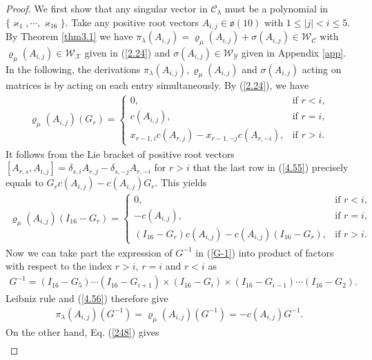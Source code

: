 \documentclass[12pt]{article}
\numberwithin{equation}{section}
\theoremstyle{definition}
\theoremstyle{remark}
\begin{document}
\begin{proof}
	We first show that any singular vector in $\mathscr{C}_{\lambda}$ must be a polynomial in $\{\varkappa_1,\cdots,\varkappa_{16}\}$.
	Take any positive root vectors $A_{i,j}\in\mathfrak{o}(10)$ with $1\leqslant |j| <i\leqslant 5$. By Theorem \ref{thm3.1} we have $\pi_{\lambda}(A_{i,j})=\varrho_{\mu}(A_{i,j})+\sigma(A_{i,j})\in\mathscr{W}_{\mathscr{C}}$ with $\varrho_{\mu}(A_{i,j})\in\mathscr{W}_{\mathscr{X}}$ given in (\ref{2.24}) and $\sigma(A_{i,j})\in\mathscr{W}_{\mathscr{Y}}$ given in Appendix \ref{app}. In the following, the derivations $\pi_{\lambda}(A_{i,j}),\varrho_{\mu}(A_{i,j})$ and $\sigma(A_{i,j})$ acting on matrices is by acting on each entry simultaneously.
	By (\ref{2.24}), we have
	\begin{align}
		\varrho_{\mu}(A_{i,j})(G_r)=\begin{cases}
			0, &\text{if }r<i,\\
			c(A_{i,j}), &\text{if }r=i,\\
			x_{r-1,i}c(A_{r,j})-x_{r-1,-j}c(A_{r,-i}), &\text{if }r>i.
		\end{cases} \label{4.55}
	\end{align}
	It follows from the Lie bracket of positive root vectors $[A_{r,s},A_{i,j}]=\delta_{s,i}A_{r,j}-\delta_{s,-j}A_{r,-i}$ for $r>i$ that the last row in (\ref{4.55}) precisely equals to $G_rc(A_{i,j})-c(A_{i,j})G_r$. This yields
	\begin{align}
		\varrho_{\mu}(A_{i,j})(I_{16}-G_r)=\begin{cases}
			0, &\text{if }r<i,\\
			-c(A_{i,j}), &\text{if }r=i,\\
			(I_{16}-G_r)c(A_{i,j})-c(A_{i,j})(I_{16}-G_r), &\text{if }r>i.
		\end{cases}\label{4.56}
	\end{align}
	Now we can take part the expression of $G^{-1}$ in (\ref{G-1})  into product of  factors with respect to the index $r>i$, $r=i$ and $r<i$ as
	\begin{eqnarray}
		G^{-1}=(I_{16}-G_5)\cdots(I_{16}-G_{i+1})\times (I_{16}-G_{i})\times (I_{16}-G_{i-1})\cdots (I_{16}-G_{2}). \label{3.108}
	\end{eqnarray}	
	Leibniz rule and (\ref{4.56}) therefore give
	\begin{eqnarray}
		\pi_{\lambda}(A_{i,j})(G^{-1})=\varrho_{\mu}(A_{i,j})(G^{-1})=-c(A_{i,j})G^{-1}. \label{4.57}
	\end{eqnarray}
	On the other hand, Eq. (\ref{248}) gives
	\begin{eqnarray}

\end{eqnarray}
\end{proof}
\end{document}
